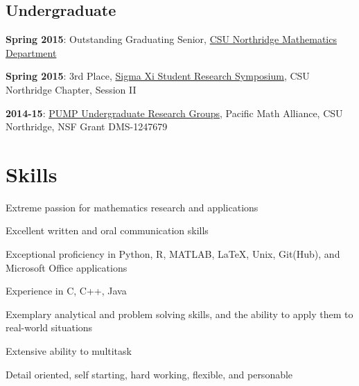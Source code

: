 \documentclass[letterpaper]{deedy-resume} %
\begin{document}
\begin{minipage}[t]{0.33\textwidth}
\subsection{Undergraduate}
\vspace{\topsep}
\begin{tightitemize}
    \item \textbf{Spring 2015}: Outstanding Graduating Senior, \setmainfont[Path = fonts/lato/,BoldItalicFont=Lato-RegIta,BoldFont=Lato-Reg,ItalicFont=Lato-LigIta]{Lato-Lig}\href{http://www.csun.edu/science-mathematics/mathematics}{CSU Northridge Mathematics Department}\setmainfont[Color=primary, Path = fonts/lato/]{Lato-Lig}
\end{tightitemize}\vspace{-3pt}
\begin{tightitemize}
    \item \textbf{Spring 2015}: 3rd Place, \setmainfont[Path = fonts/lato/,BoldItalicFont=Lato-RegIta,BoldFont=Lato-Reg,ItalicFont=Lato-LigIta]{Lato-Lig}\href{https://www.csun.edu/~danielk/SigmaXi/}{Sigma Xi Student Research Symposium}\setmainfont[Color=primary, Path = fonts/lato/]{Lato-Lig}, CSU Northridge Chapter, Session II
\end{tightitemize}\vspace{-3pt}
\begin{tightitemize}
    \item \textbf{2014-15}: \setmainfont[Path = fonts/lato/,BoldItalicFont=Lato-RegIta,BoldFont=Lato-Reg,ItalicFont=Lato-LigIta]{Lato-Lig}\href{http://www.pump-math.org/home}{PUMP Undergraduate Research Groups}\setmainfont[Color=primary, Path = fonts/lato/]{Lato-Lig}, Pacific Math Alliance, CSU Northridge, NSF Grant DMS-1247679
\end{tightitemize}


\vspace{15pt}

\section{Skills}
\vspace{\topsep}
\begin{tightitemize}
    \item Extreme passion for mathematics research and applications
    \item Excellent written and oral communication skills
    \item Exceptional proficiency in Python, R, MATLAB, \LaTeX, Unix, Git(Hub), and Microsoft Office applications
    \item Experience in C, C++, Java
    \item Exemplary analytical and problem solving skills, and the ability to apply them to real-world situations
    \item Extensive ability to multitask
    \item Detail oriented, self starting, hard working, flexible, and personable
\end{tightitemize}


\end{minipage}
\end{document}
